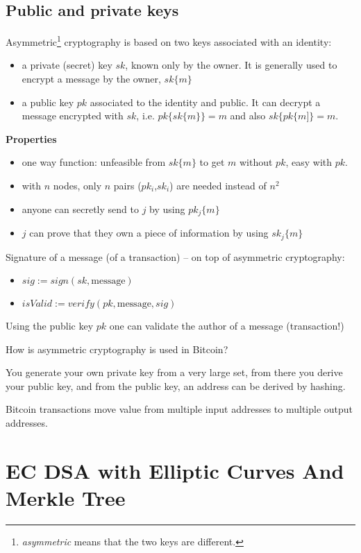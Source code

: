 \subsection{Public and private keys}

Asymmetric\footnote{\textit{asymmetric} means that the two keys are different.} cryptography is based on two keys associated with an identity:
\begin{itemize}
	\item a private (secret) key $sk$, known only by the owner. It is generally used to encrypt a message by the owner, $sk\{m\}$
	\item a public key $pk$ associated to the identity and public. It can decrypt a message encrypted with $sk$, i.e. $pk\{sk\{m\}\} =m$ and also $sk\{pk\{m]\} =m$.
\end{itemize}

\textbf{Properties}
\begin{itemize}
	\item one way function: unfeasible from $sk\{m\}$ to get $m$ without $pk$, easy with $pk$.
	\item with $n$ nodes, only $n$ pairs ($pk_{i}$,$sk_{i}$) are needed instead of $n^{2}$
	\item anyone can secretly send to $j$ by using $pk_{j}\{m\}$
	\item $j$ can prove that they own a piece of information by using $sk_{j}\{m\}$
\end{itemize}

Signature of a message (of a transaction) – on top of asymmetric cryptography:
\begin{itemize}
	\item $sig:=sign\left( sk,\text{message}\right)$
	\item $isValid:=verify\left( pk,\text{message} ,sig\right)$
\end{itemize}

Using the public key $pk$ one can validate the author of a message (transaction!)

How is asymmetric cryptography is used in Bitcoin?

You generate your own private key from a very large set, from there you derive your public key, and from the public key, an address can be derived by hashing.


Bitcoin transactions move value from multiple input addresses to multiple output addresses.
\section{EC DSA with Elliptic Curves And Merkle Tree}

